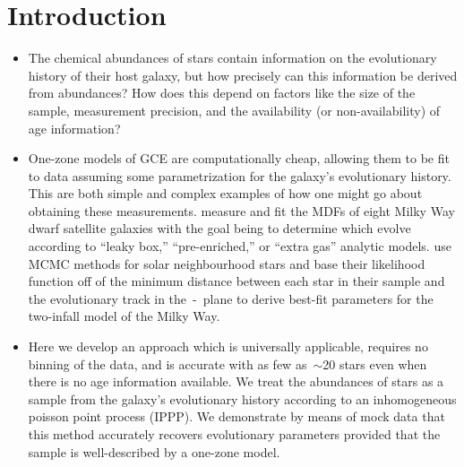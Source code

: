 \documentclass[ms.tex]{subfiles}
\begin{document}
\section{Introduction}
\label{sec:intro}

\begin{itemize}

	\item The chemical abundances of stars contain information on the
	evolutionary history of their host galaxy, but how precisely can this
	information be derived from abundances?
	How does this depend on factors like the size of the sample, measurement
	precision, and the availability (or non-availability) of age information?

	\item One-zone models of GCE are computationally cheap, allowing them to be
	fit to data assuming some parametrization for the galaxy's evolutionary
	history.
	This are both simple and complex examples of how one might go about
	obtaining these measurements.
	\citet{Kirby2011} measure and fit the MDFs of eight Milky Way dwarf
	satellite galaxies with the goal being to determine which evolve according
	to ``leaky box,'' ``pre-enriched,'' or ``extra gas'' analytic models.
	\citet{Spitoni2020} use MCMC methods for solar neighbourhood stars and
	base their likelihood function off of the minimum distance between each
	star in their sample and the evolutionary track in the~\afe-\feh~plane to
	derive best-fit parameters for the two-infall model of the Milky Way.

	\item Here we develop an approach which is universally applicable, requires
	no binning of the data, and is accurate with as few as~$\sim$20 stars even
	when there is no age information available.
	We treat the abundances of stars as a sample from the galaxy's evolutionary
	history according to an inhomogeneous poisson point process (IPPP).
	We demonstrate by means of mock data that this method accurately recovers
	evolutionary parameters provided that the sample is well-described by a
	one-zone model.


\end{itemize}
\end{document}
